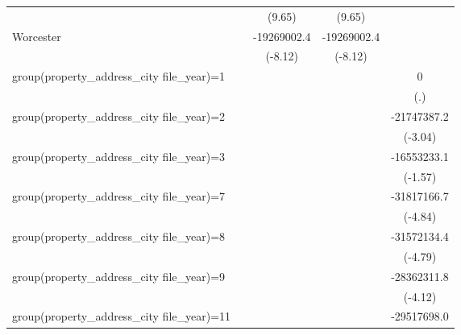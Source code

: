 {\begin{tabular}{l*{4}{c}}
                    &                     &      (9.65)         &      (9.65)         &                     \\
\addlinespace
Worcester           &                     & -19269002.4\sym{***}& -19269002.4\sym{***}&                     \\
                    &                     &     (-8.12)         &     (-8.12)         &                     \\
\addlinespace
group(property\_address\_city file\_year)=1&                     &                     &                     &           0         \\
                    &                     &                     &                     &         (.)         \\
\addlinespace
group(property\_address\_city file\_year)=2&                     &                     &                     & -21747387.2\sym{**} \\
                    &                     &                     &                     &     (-3.04)         \\
\addlinespace
group(property\_address\_city file\_year)=3&                     &                     &                     & -16553233.1         \\
                    &                     &                     &                     &     (-1.57)         \\
\addlinespace
group(property\_address\_city file\_year)=7&                     &                     &                     & -31817166.7\sym{***}\\
                    &                     &                     &                     &     (-4.84)         \\
\addlinespace
group(property\_address\_city file\_year)=8&                     &                     &                     & -31572134.4\sym{***}\\
                    &                     &                     &                     &     (-4.79)         \\
\addlinespace
group(property\_address\_city file\_year)=9&                     &                     &                     & -28362311.8\sym{***}\\
                    &                     &                     &                     &     (-4.12)         \\
\addlinespace
group(property\_address\_city file\_year)=11&                     &                     &                     & -29517698.0\sym{***}\\

\end{tabular}}
